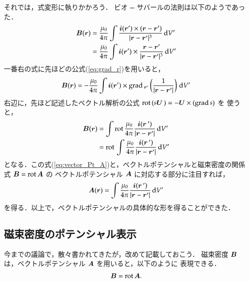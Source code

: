             それでは，式変形に執りかかろう．
            ビオ$=$サバールの法則は以下のようであった．
                \begin{align*}
                    \boldsymbol{B}(\boldsymbol{r})
                    &=\frac{\mu_{0}}{4\pi}
                    \int\frac{\boldsymbol{i}(\boldsymbol{r}')\times
                    (\boldsymbol{r}-\boldsymbol{r}')
                    }{|\boldsymbol{r}-\boldsymbol{r}'|^{3}}\,\mathrm{d} V' \\
                    &=\frac{\mu_{0}}{4\pi}
                    \int\boldsymbol{i}(\boldsymbol{r}')\times
                    \frac{\boldsymbol{r}-\boldsymbol{r}'}
                    {|\boldsymbol{r}-\boldsymbol{r}'|^{3}}\,\mathrm{d} V'
                \end{align*}
            一番右の式に先ほどの公式(\ref{eq:grad_r})を用いると，
                \begin{align}
                    \boldsymbol{B}(\boldsymbol{r})
                    =-\frac{\mu_{0}}{4\pi}
                    \int\boldsymbol{i}(\boldsymbol{r}')\times
                    \mathrm{grad}\,_{\boldsymbol{r}'} \left( \frac{1}{| \boldsymbol{r} -\boldsymbol{r}'|}\right)
                    \,\mathrm{d} V'
                \end{align}
            右辺に，先ほど記述したベクトル解析の公式 $\mathrm{rot}\,(s\boldsymbol{U}\,) = - \boldsymbol{U}\times(\mathrm{grad}\, s)$ を
            使うと，
                \begin{align}\label{eq:vector_Pt_A}
                    \bB(\br)
                    &=\int \drot \frac{\mu_{0}}{4\pi}\frac{\bi(\br\,')}{| \br -\br'|}\df V' \notag \\
                    &=\drot \int \frac{\mu_{0}}{4\pi}\frac{\bi(\br\,')}{| \br -\br'|}\df V'
                \end{align}
            となる．この式(\ref{eq:vector_Pt_A})と，ベクトルポテンシャルと磁束密度の関係式 $\boldsymbol{B}=\mathrm{rot}\,\boldsymbol{A}$ の
            ベクトルポテンシャル $\boldsymbol{A}$ に対応する部分に注目すれば，
                \begin{align}
                    \boldsymbol{A}(\boldsymbol{r})
                    =\int\frac{\mu_{0}}{4\pi}\frac{\boldsymbol{i}(\boldsymbol{r}\,')}{| \boldsymbol{r} -\boldsymbol{r}'|}\,\mathrm{d} V'
                \end{align}
            を得る．以上で，ベクトルポテンシャルの具体的な形を得ることができた．

        \subsection{磁束密度のポテンシャル表示}
            今までの議論で，散々書かれてきたが，改めて記載しておこう．
            磁束密度 $\boldsymbol{B}$ は，ベクトルポテンシャル $\boldsymbol{A}$ を用いると，以下のように
            表現できる．
                \begin{align}
                    \boldsymbol{B} = \mathrm{rot}\, \boldsymbol{A}.
                \end{align}

